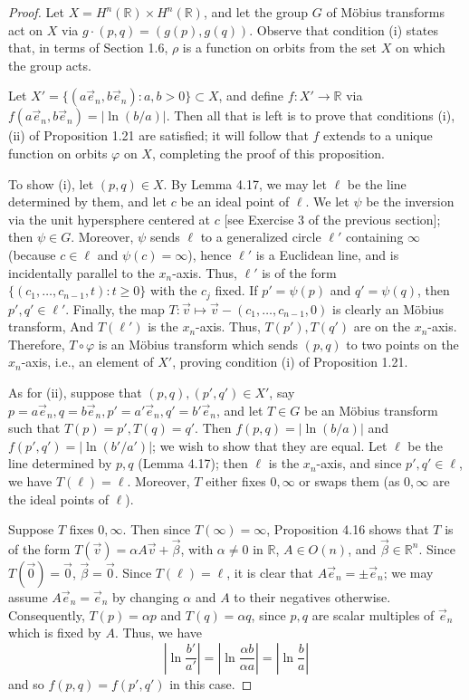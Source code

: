 \documentclass[leqno]{book}
\begin{document}
\begin{proof}
Let $X=H^n(\mathbb R)\times H^n(\mathbb R)$, and let the group $G$ of M\"obius transforms act on $X$ via $g\cdot(p,q)=(g(p),g(q))$.  Observe that condition (i) states that, in terms of Section 1.6, $\rho$ is a function on orbits from the set $X$ on which the group acts.

Let $X'=\{(a\vec e_n,b\vec e_n):a,b>0\}\subset X$, and define $f:X'\to\mathbb R$ via $f(a\vec e_n,b\vec e_n)=|\ln(b/a)|$.  Then all that is left is to prove that conditions (i), (ii) of Proposition 1.21 are satisfied; it will follow that $f$ extends to a unique function on orbits $\varphi$ on $X$, completing the proof of this proposition.

To show (i), let $(p,q)\in X$.  By Lemma 4.17, we may let $\ell$ be the line determined by them, and let $c$ be an ideal point of $\ell$.  We let $\psi$ be the inversion via the unit hypersphere centered at $c$ [see Exercise 3 of the previous section]; then $\psi\in G$.  Moreover, $\psi$ sends $\ell$ to a generalized circle $\ell'$ containing $\infty$ (because $c\in\ell$ and $\psi(c)=\infty$), hence $\ell'$ is a Euclidean line, and is incidentally parallel to the $x_n$-axis.  Thus, $\ell'$ is of the form $\{(c_1,\dots,c_{n-1},t):t\geqslant 0\}$ with the $c_j$ fixed.  If $p'=\psi(p)$ and $q'=\psi(q)$, then $p',q'\in\ell'$.  Finally, the map $T:\vec v\mapsto\vec v-(c_1,\dots,c_{n-1},0)$ is clearly an M\"obius transform, And $T(\ell')$ is the $x_n$-axis.  Thus, $T(p'),T(q')$ are on the $x_n$-axis.  Therefore, $T\circ\varphi$ is an M\"obius transform which sends $(p,q)$ to two points on the $x_n$-axis, i.e., an element of $X'$, proving condition (i) of Proposition 1.21.

As for (ii), suppose that $(p,q),(p',q')\in X'$, say $p=a\vec e_n,q=b\vec e_n,p'=a'\vec e_n,q'=b'\vec e_n$, and let $T\in G$ be an M\"obius transform such that $T(p)=p',T(q)=q'$.  Then $f(p,q)=|\ln(b/a)|$ and $f(p',q')=|\ln(b'/a')|$; we wish to show that they are equal.  Let $\ell$ be the line determined by $p,q$ (Lemma 4.17); then $\ell$ is the $x_n$-axis, and since $p',q'\in\ell$, we have $T(\ell)=\ell$.  Moreover, $T$ either fixes $0,\infty$ or swaps them (as $0,\infty$ are the ideal points of $\ell$).

Suppose $T$ fixes $0,\infty$.  Then since $T(\infty)=\infty$, Proposition 4.16 shows that $T$ is of the form $T(\vec v)=\alpha A\vec v+\vec\beta$, with $\alpha\ne 0$ in $\mathbb R$, $A\in O(n)$, and $\vec\beta\in\mathbb R^n$.  Since $T(\vec 0)=\vec 0$, $\vec\beta=\vec 0$.  Since $T(\ell)=\ell$, it is clear that $A\vec e_n=\pm\vec e_n$; we may assume $A\vec e_n=\vec e_n$ by changing $\alpha$ and $A$ to their negatives otherwise.  Consequently, $T(p)=\alpha p$ and $T(q)=\alpha q$, since $p,q$ are scalar multiples of $\vec e_n$ which is fixed by $A$.  Thus, we have
$$\left|\ln\frac{b'}{a'}\right|=\left|\ln\frac{\alpha b}{\alpha a}\right|=\left|\ln\frac ba\right|$$
and so $f(p,q)=f(p',q')$ in this case.


\end{proof}
\end{document}
